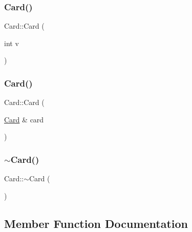 \mbox{\label{class_card_a85f2e4a438c7fdfcff3bc2c6c2f64e42}} 
\subsubsection{\texorpdfstring{Card()}{Card()}\hspace{0.1cm}{\footnotesize\ttfamily [2/3]}}
{\footnotesize\ttfamily Card\+::\+Card (\begin{DoxyParamCaption}\item[{int}]{v }\end{DoxyParamCaption})}

\mbox{\label{class_card_acd5e2392580684236188040fa874dbf2}} 
\subsubsection{\texorpdfstring{Card()}{Card()}\hspace{0.1cm}{\footnotesize\ttfamily [3/3]}}
{\footnotesize\ttfamily Card\+::\+Card (\begin{DoxyParamCaption}\item[{\mbox{\hyperlink{class_card}{Card}} \&}]{card }\end{DoxyParamCaption})}

\mbox{\label{class_card_a4e05b0b68e43e5e76c6194458cee874f}} 
\subsubsection{\texorpdfstring{$\sim$\+Card()}{~Card()}}
{\footnotesize\ttfamily Card\+::$\sim$\+Card (\begin{DoxyParamCaption}{ }\end{DoxyParamCaption})}



\subsection{Member Function Documentation}
\mbox{\label{class_card_a829622deae536453d23467ae15f42259}} 
